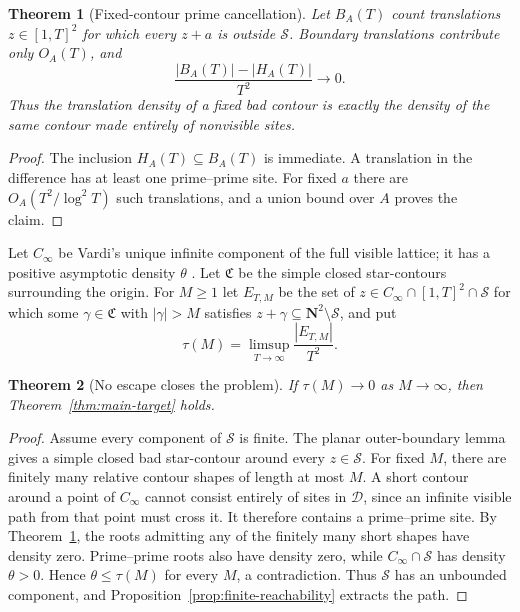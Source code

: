\documentclass[11pt]{article}
\newtheorem{theorem}{Theorem}[section]
\theoremstyle{definition}
\theoremstyle{remark}
\newcommand{\N}{\mathbf N}
\newcommand{\cS}{\mathcal S}
\begin{document}
\begin{theorem}[Fixed-contour prime cancellation]
\label{thm:fixed-contour-cancellation}
Let $B_A(T)$ count translations $z\in[1,T]^2$ for which every $z+a$ is
outside $\cS$.  Boundary translations contribute only $O_A(T)$, and
\[
 \frac{|B_A(T)|-|H_A(T)|}{T^2}\longrightarrow0.
\]
Thus the translation density of a fixed bad contour is exactly the density of
the same contour made entirely of nonvisible sites.
\end{theorem}

\begin{proof}
The inclusion $H_A(T)\subseteq B_A(T)$ is immediate.  A translation in the
difference has at least one prime--prime site.  For fixed $a$ there are
$O_A(T^2/\log^2T)$ such translations, and a union bound over $A$ proves the
claim.
\end{proof}

Let $C_\infty$ be Vardi's unique infinite component of the full visible
lattice; it has a positive asymptotic density $\theta$ \cite{Vardi1999}.  Let
$\mathfrak C$ be the simple closed star-contours surrounding the origin.  For
$M\geq1$ let $E_{T,M}$ be the set of
$z\in C_\infty\cap[1,T]^2\cap\cS$ for which some
$\gamma\in\mathfrak C$ with $|\gamma|>M$ satisfies
$z+\gamma\subseteq\N^2\setminus\cS$, and put
\[
 \tau(M)=\limsup_{T\to\infty}\frac{|E_{T,M}|}{T^2}.
\]

\begin{theorem}[No escape closes the problem]
\label{thm:no-escape-closes}
If $\tau(M)\to0$ as $M\to\infty$, then Theorem~\ref{thm:main-target} holds.
\end{theorem}

\begin{proof}
Assume every component of $\cS$ is finite.  The planar outer-boundary lemma
gives a simple closed bad star-contour around every $z\in\cS$.  For fixed
$M$, there are finitely many relative contour shapes of length at most $M$.
A short contour around a point of $C_\infty$ cannot consist entirely of sites
in $\mathcal D$, since an infinite visible path from that point must cross it.
It therefore contains a prime--prime site.  By
Theorem~\ref{thm:fixed-contour-cancellation}, the roots admitting any of the
finitely many short shapes have density zero.  Prime--prime roots also have
density zero, while $C_\infty\cap\cS$ has density $\theta>0$.  Hence
$\theta\leq\tau(M)$ for every $M$, a contradiction.  Thus $\cS$ has an
unbounded component, and Proposition~\ref{prop:finite-reachability} extracts
the path.
\end{proof}
\end{document}

